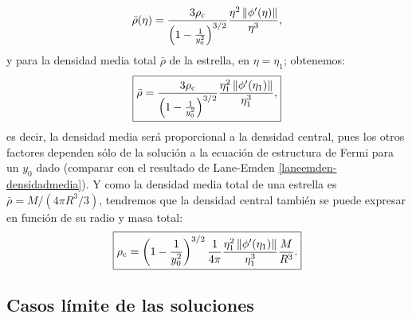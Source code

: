 \begin{align}
\bar{\rho}(\eta)=\frac{3\rho_{\rm c}}{\left(1-\frac{1}{y_0^2}\right)^{3/2}}\frac{\eta^2\left\Vert\phi'(\eta)\right\Vert}{\eta^3},
\end{align}
y para la densidad media total $\bar{\rho}$ de la estrella, en $\eta=\eta_1$; obtenemos:
\begin{align}\label{ec-fermi-densidadmediaycentral}
\boxed{\bar{\rho}=\frac{3\rho_{\rm c}}{\left(1-\frac{1}{y_0^2}\right)^{3/2}}\frac{\eta_1^2\left\Vert\phi'(\eta_1)\right\Vert}{\eta_1^3},}
\end{align}
es decir, la densidad media será proporcional a la densidad central, pues los otros factores dependen sólo de la solución a la ecuación de estructura de Fermi para un $y_0$ dado (comparar con el resultado de Lane-Emden \eqref{laneemden-densidadmedia}). Y como la densidad media total de una estrella es $\bar{\rho}=M/(4\pi R^3/3)$, tendremos que la densidad central también se puede expresar en función de su radio y masa total:
\begin{equation}
\boxed{ \rho_{\rm c}=\left(1-\frac{1}{y_0^2}\right)^{3/2}\frac{1}{4\pi}\frac{\eta_1^2\left\Vert\phi'(\eta_1)\right\Vert}{\eta_1^3}\frac{M}{R^3}.}
\end{equation}



\subsection{Casos límite de las soluciones}\label{sec:ec-fermi-limites}

